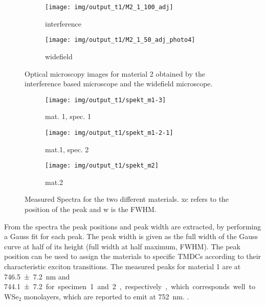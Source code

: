 \begin{figure}[H]
    \centering
    \begin{subfigure}{0.4\textwidth}
        \centering
        \texttt{[image: img/output\_t1/M2\_1\_100\_adj]}
        \caption{interference}
	      \label{fig_mono_spec3_int}
    \end{subfigure}
    \begin{subfigure}{0.49\textwidth}
        \centering
        \texttt{[image: img/output\_t1/M2\_1\_50\_adj\_photo4]}
        \caption{widefield}
	      \label{fig_mono_spec3_wide}
    \end{subfigure}
    \caption{Optical microscopy images for material 2 obtained by the interference based microscope and the widefield microscope.}
	\label{fig_mono_spec3} %
\end{figure}

\begin{figure}[H]
    \centering
    \begin{subfigure}{0.47\textwidth}
        \centering
        \texttt{[image: img/output\_t1/spekt\_m1-3]}
        \caption{mat. 1, spec. 1}
	      \label{fig_mono_spec1_1dspec}
    \end{subfigure}
    \begin{subfigure}{0.47\textwidth}
        \centering
        \texttt{[image: img/output\_t1/spekt\_m1-2-1]}
        \caption{mat.1, spec. 2}
	      \label{fig_mono_spec2_1dspec}
    \end{subfigure}
    \begin{subfigure}{0.6\textwidth}
        \centering
        \texttt{[image: img/output\_t1/spekt\_m2]}
        \caption{mat.2}
	      \label{fig_mono_spec3_1dspec}
    \end{subfigure}
    \caption{Measured Spectra for the two different materials. xc refers to the position of the peak and w is the FWHM.}
	\label{fig_mono_1dspectra} %
\end{figure}

From the spectra the peak positions and peak width are extracted, by performing a Gauss fit for each peak.
The peak width is given as the full width of the Gauss curve at half of its height (full width at half maximum, FWHM).
The peak position can be used to assign the materials to specific TMDCs according to their characteristic exciton transitions.
The measured peaks for material 1 are at \SI{746,5\pm 7,2}{nm} and \SI{744,1 \pm 7,2} for specimen 1 and 2, respectively, which corresponds well to WSe$_2$ monolayers, which are reported to emit at \SI{752}{nm}. \cite{Tonndorf2013}.

